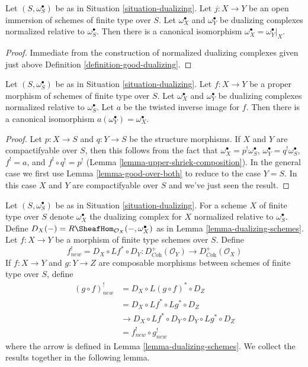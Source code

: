 \begin{lemma}
\label{lemma-open-immersion-good-dualizing-complex}
Let $(S, \omega_S^\bullet)$ be as in Situation \ref{situation-dualizing}.
Let $j : X \to Y$ be an open immersion of schemes of finite type over $S$.
Let $\omega_X^\bullet$ and $\omega_Y^\bullet$ be dualizing complexes
normalized relative to $\omega_S^\bullet$. Then there is a canonical
isomorphism $\omega_X^\bullet = \omega_Y^\bullet|_X$.
\end{lemma}

\begin{proof}
Immediate from the construction of normalized dualizing complexes
given just above
Definition \ref{definition-good-dualizing}.
\end{proof}

\begin{lemma}
\label{lemma-proper-map-good-dualizing-complex}
Let $(S, \omega_S^\bullet)$ be as in Situation \ref{situation-dualizing}.
Let $f : X \to Y$ be a proper morphism of schemes of finite type over $S$.
Let $\omega_X^\bullet$ and $\omega_Y^\bullet$ be dualizing complexes
normalized relative to $\omega_S^\bullet$. Let $a$ be the twisted inverse
image for $f$. Then there is a canonical isomorphism
$a(\omega_Y^\bullet) = \omega_X^\bullet$.
\end{lemma}

\begin{proof}
Let $p : X \to S$ and $q : Y \to S$ be the structure morphisms.
If $X$ and $Y$ are compactifyable over $S$, then this follows
from the fact that $\omega_X^\bullet = p^!\omega_S^\bullet$,
$\omega_Y^\bullet = q^!\omega_S^\bullet$, $f^! = a$, and
$f^! \circ q^! = p^!$ (Lemma \ref{lemma-upper-shriek-composition}).
In the general case we first use Lemma \ref{lemma-good-over-both}
to reduce to the case $Y = S$. In this case $X$ and $Y$
are compactifyable over $S$ and we've just seen the result.
\end{proof}

\noindent
Let $(S, \omega_S^\bullet)$ be as in Situation \ref{situation-dualizing}.
For a scheme $X$ of finite type over $S$ denote $\omega_X^\bullet$ the
dualizing complex for $X$ normalized relative to $\omega_S^\bullet$.
Define $D_X(-) = R\SheafHom_{\mathcal{O}_X}(-, \omega_X^\bullet)$
as in Lemma \ref{lemma-dualizing-schemes}.
Let $f : X \to Y$ be a morphism of finite type schemes over $S$.
Define
$$
f_{new}^! = D_X \circ Lf^* \circ D_Y :
D_{\textit{Coh}}^+(\mathcal{O}_Y)
\to
D_{\textit{Coh}}^+(\mathcal{O}_X)
$$
If $f : X \to Y$ and $g : Y \to Z$ are composable
morphisms between schemes of finite type over $S$, define
\begin{align*}
(g \circ f)^!_{new} & = D_X \circ L(g \circ f)^* \circ D_Z \\
& = D_X \circ Lf^* \circ Lg^* \circ D_Z \\
& \to D_X \circ Lf^* \circ D_Y \circ D_Y \circ Lg^* \circ D_Z \\
& = f^!_{new} \circ g^!_{new}
\end{align*}
where the arrow is defined in Lemma \ref{lemma-dualizing-schemes}.
We collect the results together in the following lemma.

